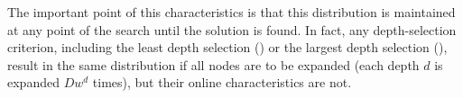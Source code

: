 The important point of this characteristics is that this
distribution is maintained at any point of the search until the solution
is found. In fact, any depth-selection criterion, including the least
depth selection (\fifo) or the largest depth selection (\lifo), 
result in the same distribution if all nodes are to be expanded (each
depth $d$ is expanded $Dw^d$ times), but their
online characteristics are not.
